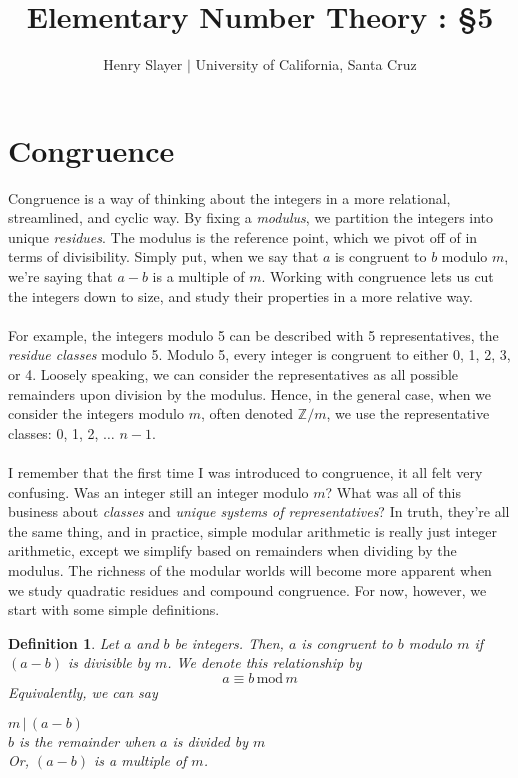 \documentclass{article}
\newtheorem{definition}{Definition}
\newcommand{\X}[1]{\, \text{mod} \, #1}
\newcommand{\divv}{\,|\,}
\begin{document}
 

\title{Elementary Number Theory : \S5} 
\author{Henry Slayer $|$ University of California, Santa Cruz} 
\date{}
\maketitle
\section*{Congruence} 
Congruence is a way of thinking about the integers in a more relational, streamlined, and cyclic way. By fixing a \textit{modulus}, we partition the integers into unique \textit{residues}. The modulus is the reference point, which we pivot off of in terms of divisibility. Simply put, when we say that $a$ is congruent to $b$ modulo $m$, we're saying that $a - b$ is a multiple of $m$. Working with congruence lets us cut the integers down to size, and study their properties in a more relative way. \\\\
For example, the integers modulo 5 can be described with 5 representatives, the \textit{residue classes} modulo 5. Modulo 5, every integer is congruent to either 0, 1, 2, 3, or 4. Loosely speaking, we can consider the representatives as all possible remainders upon division by the modulus. Hence, in the general case, when we consider the integers modulo $m$, often denoted $\mathds{Z}/m$, we use the representative classes: 0, 1, 2, $\dots$ $n-1$. \\\\
I remember that the first time I was introduced to congruence, it all felt very confusing. Was an integer still an integer modulo $m$? What was all of this business about \textit{classes} and \textit{unique systems of representatives}? In truth, they're all the same thing, and in practice, simple modular arithmetic is really just integer arithmetic, except we simplify based on remainders when dividing by the modulus. The richness of the modular worlds will become more apparent when we study quadratic residues and compound congruence. For now, however, we start with some simple definitions. 
\begin{mdframed} 
\begin{definition} 
Let $a$ and $b$ be integers. Then, $a$ is congruent to $b$ modulo $m$ if $(a - b)$ is divisible by $m$. We denote this relationship by 
\[a\equiv b\X{m}\]
Equivalently, we can say
\begin{center}  
$m\divv (a-b)$\\\medskip
$b$ is the remainder when $a$ is divided by $m$\\\medskip
Or, $(a-b)$ is a multiple of $m$. 
\end{center} 
\end{definition} 
\end{mdframed}
\end{document}
